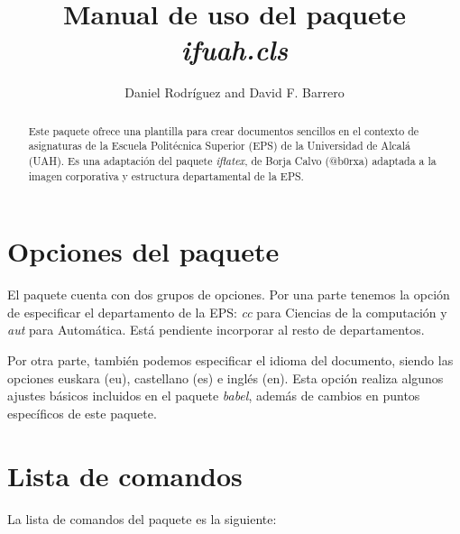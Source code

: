 \documentclass[es,aut]{ifuah}
\title{Manual de uso del paquete \textit{ifuah.cls}}
\author{Daniel Rodr\'iguez and David F. Barrero}
\begin{document}
\ifuahyear{} %
\ifuahmail{} %
\date{} %

\maketitle

\begin{abstract}
Este paquete ofrece una plantilla para crear documentos sencillos en el contexto de asignaturas de la Escuela Polit\'ecnica Superior (EPS) de la Universidad de Alcal\'a (UAH). Es una adaptaci\'on del paquete \textit{iflatex}, de Borja Calvo (@b0rxa) adaptada a la imagen corporativa y estructura departamental de la EPS. 
\end{abstract}

\section{Opciones del paquete}
El paquete cuenta con dos grupos de opciones. Por una parte tenemos la opci\'on de especificar el departamento de la EPS: \textit{cc} para Ciencias de la computaci\'on y \textit{aut} para Autom\'atica. Est\'a pendiente incorporar al resto de departamentos.

Por otra parte, tambi\'en podemos especificar el idioma del documento, siendo las opciones euskara (eu), castellano (es) e ingl\'es (en). Esta opci\'on realiza algunos ajustes b\'asicos incluidos en el paquete \textit{babel}, adem\'as de cambios en puntos espec\'ificos de este paquete.

\section{Lista de comandos}

La lista de comandos del paquete es la siguiente:
\end{document}
